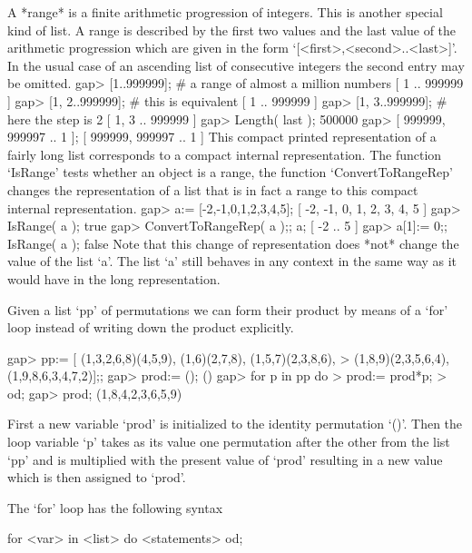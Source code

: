 A *range* is a finite arithmetic progression of integers. This is another
special kind of list. A range is described by the first two values and the last
value of the arithmetic progression which are given in the form
`[<first>,<second>..<last>]'.
In the usual case of an ascending list of
consecutive integers the second entry may be omitted.
\beginexample
gap> [1..999999];     #  a range of almost a million numbers
[ 1 .. 999999 ]
gap> [1, 2..999999];  #  this is equivalent
[ 1 .. 999999 ]
gap> [1, 3..999999];  #  here the step is 2
[ 1, 3 .. 999999 ]
gap> Length( last );
500000
gap> [ 999999, 999997 .. 1 ];
[ 999999, 999997 .. 1 ]
\endexample
This compact printed representation of a fairly long  list corresponds to
a  compact internal representation.
The function `IsRange' tests whether an object is a range,
the function `ConvertToRangeRep' changes the representation of a list
that is in fact a range to this compact internal representation.
\beginexample
gap> a:= [-2,-1,0,1,2,3,4,5];
[ -2, -1, 0, 1, 2, 3, 4, 5 ]
gap> IsRange( a );
true
gap> ConvertToRangeRep( a );;  a;
[ -2 .. 5 ]
gap> a[1]:= 0;; IsRange( a );
false
\endexample
Note that this  change of representation does  *not* change the  value of
the list `a'. The list `a'  still behaves in any context  in the same way
as it would have in the long representation.




Given a list `pp' of permutations we can form their product by means of a
`for' loop instead of writing down the product explicitly.

\beginexample
gap> pp:= [ (1,3,2,6,8)(4,5,9), (1,6)(2,7,8), (1,5,7)(2,3,8,6),
>           (1,8,9)(2,3,5,6,4), (1,9,8,6,3,4,7,2)];;
gap> prod:= ();        
()
gap> for p in pp do
>       prod:= prod*p;    
>    od;
gap> prod;        
(1,8,4,2,3,6,5,9)
\endexample

First a  new variable `prod'  is initialized  to the identity permutation
`()'. Then the loop variable `p' takes as its value one permutation after
the other from the list `pp' and is multiplied with  the present value of
`prod'  resulting in a  new value which  is then assigned  to `prod'.

The `for' loop has the following syntax

\)\fmark for <var> in <list> do <statements> od;

